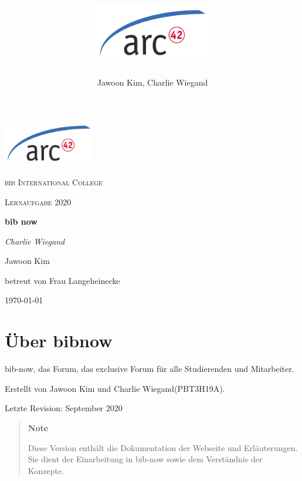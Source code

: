 \documentclass[12pt,titlepage]{article}
\title{\includegraphics{images/arc42-logo.png}}
\author{Jawoon Kim, Charlie Wiegand}
\begin{document}
    \begin{titlepage}
    \centering
    \includegraphics[width=0.3\textwidth]{images/arc42-logo.png}\par\vspace{1cm}
    {\scshape\LARGE bib International College\par}
    \vspace{1cm}
    {\rmfamily\scshape Lernaufgabe 2020\par}
    \vspace{1.5cm}
    {\Huge\bfseries bib now\par}
    \vspace{2cm}
    {\Large\itshape Charlie Wiegand\par Jawoon Kim\par}
    \vfill
    betreut von Frau Langeheinecke\par
    \vfill
    {\large \today\par}
    \end{titlepage}

\tableofcontents
\newpage

\listoffigures

\pagebreak


\maketitle

\vspace{2cm}


\section{Über bibnow}


bib-now, das Forum, das exclusive Forum für alle Studierenden und Mitarbeiter.

\vspace{1cm}

Erstellt von Jawoon Kim und Charlie Wiegand(PBT3H19A).

Letzte Revision: September 2020

\vspace{2cm}

\begin{quote}
\textbf{Note}

Diese Version enthält die Dokumentation der Webseite und Erläuterungen. Sie dient
der Einarbeitung in bib-now sowie dem Verständnis der Konzepte. 
\end{quote}
\end{document}

